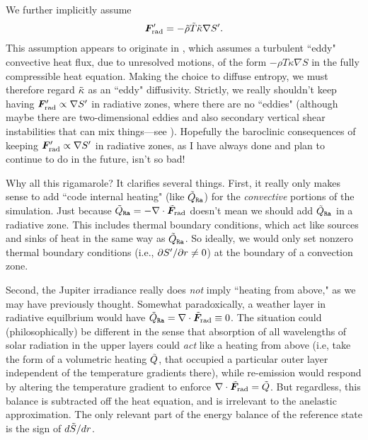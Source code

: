 \documentclass[12pt]{article}
\numberwithin{equation}{section}
\begin{document}
We further implicitly assume
\begin{align}
\bm{F}^\prime_{\rm rad}=-\tilde{\rho} \tilde{T} \tilde{\kappa} \nabla {S^\prime}.
\end{align}
This assumption appears to originate in \citet{Gilman1981}, which assumes a turbulent ``eddy" convective heat flux, due to unresolved motions, of the form $-\rho T\kappa\nabla S$ in the fully compressible heat equation. Making the choice to diffuse entropy, we must therefore regard $\tilde{\kappa}$ as an ``eddy" diffusivity. Strictly, we really shouldn't keep having $\bm{F}^\prime_{\rm rad}\propto\nabla{S^\prime}$ in radiative zones, where there are no ``eddies" (although maybe there are two-dimensional eddies and also secondary vertical shear instabilities that can mix things---see \citealt{Cope2020,Garaud2020}). Hopefully the baroclinic consequences of keeping $\bm{F}^\prime_{\rm rad}\propto\nabla{S^\prime}$ in radiative zones, as I have always done and plan to continue to do in the future, isn't so bad!

Why all this rigamarole? It clarifies several things. First, it really only makes sense to add ``code internal heating" (like $\tilde{Q}_{\texttt{Ra}}$) for the \textit{convective} portions of the simulation. Just because $\tilde{Q}_{\texttt{Ra}}=-\nabla\cdot\tilde{\bm{F}}_{\rm rad}$ doesn't mean we should add $\tilde{Q}_{\texttt{Ra}}$ in a radiative zone. This includes thermal boundary conditions, which act like sources and sinks of heat in the same way as $\tilde{Q}_{\texttt{Ra}}$. So ideally, we would only set nonzero thermal boundary conditions (i.e., $\partial{S^\prime}/\partial r\neq0$) at the boundary of a convection zone. 

Second, the Jupiter irradiance really does \textit{not} imply ``heating from above," as we may have previously thought.  Somewhat paradoxically, a weather layer in radiative equilbrium would have $\tilde{Q}_{\texttt{Ra}}=\nabla\cdot\tilde{\bm{F}}_{\rm rad}\equiv0$. The situation could (philosophically) be different in the sense that absorption of all wavelengths of solar radiation in the upper layers could \textit{act} like a heating from above (i.e, take the form of a volumetric heating $\tilde{Q}$, that occupied a particular outer layer independent of the temperature gradients there), while re-emission would respond by altering the temperature gradient to enforce $\nabla\cdot\tilde{\bm{F}}_{\rm rad}=\tilde{Q}$. But regardless, this balance is subtracted off the heat equation, and is irrelevant to the anelastic approximation. The only relevant part of the energy balance of the reference state is the sign of $d\tilde{S}/dr$. 
\end{document}
